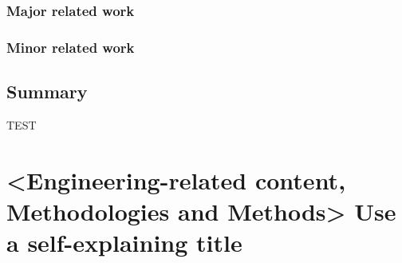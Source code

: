 \documentclass[a4paper,10pt,twocolumn]{article}
\numberwithin{figure}{section}
\numberwithin{table}{section}
\begin{document}

\subsubsection{Major related work}

\subsubsection{Minor related work}

\subsection{Summary}

\newpage
TEST
\newpage


\section{<Engineering-related content, Methodologies and Methods>
Use a self-explaining title}

\end{document}
